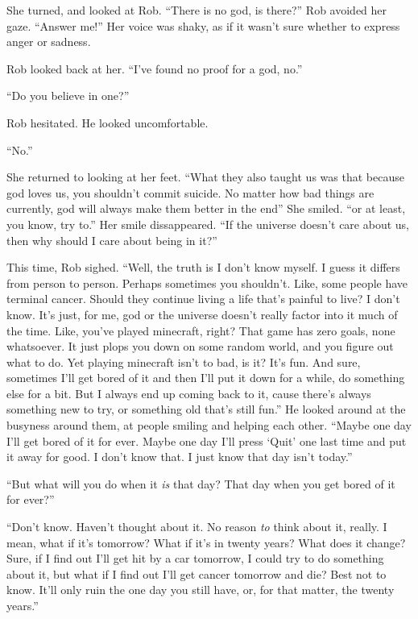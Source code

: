 \documentclass[letterpaper,12pt]{report}
\begin{document}
She turned, and looked at Rob. ``There is no god, is there?'' Rob avoided her gaze. ``Answer me!'' Her voice was shaky, as if it wasn't sure whether to express anger or sadness.

Rob looked back at her. ``I've found no proof for a god, no.''

``Do you believe in one?''

Rob hesitated. He looked uncomfortable.

``No.''

She returned to looking at her feet. ``What they also taught us was that because god loves us, you shouldn't commit suicide. No matter how bad things are currently, god will always make them better in the end'' She smiled. ``or at least, you know, try to.'' Her smile dissappeared. ``If the universe doesn't care about us, then why should I care about being in it?''

This time, Rob sighed. ``Well, the truth is I don't know myself. I guess it differs from person to person. Perhaps sometimes you shouldn't. Like, some people have terminal cancer. Should they continue living a life that's painful to live? I don't know. It's just, for me, god or the universe doesn't really factor into it much of the time. Like, you've played minecraft, right? That game has zero goals, none whatsoever. It just plops you down on some random world, and you figure out what to do. Yet playing minecraft isn't to bad, is it? It's fun. And sure, sometimes I'll get bored of it and then I'll put it down for a while, do something else for a bit. But I always end up coming back to it, cause there's always something new to try, or something old that's still fun.'' He looked around at the busyness around them, at people smiling and helping each other. ``Maybe one day I'll get bored of it for ever. Maybe one day I'll press `Quit' one last time and put it away for good. I don't know that. I just know that day isn't today.''

``But what will you do when it \textit{is} that day? That day when you get bored of it for ever?''

``Don't know. Haven't thought about it. No reason \textit{to} think about it, really. I mean, what if it's tomorrow? What if it's in twenty years? What does it change? Sure, if I find out I'll get hit by a car tomorrow, I could try to do something about it, but what if I find out I'll get cancer tomorrow and die? Best not to know. It'll only ruin the one day you still have, or, for that matter, the twenty years.''
\end{document}

